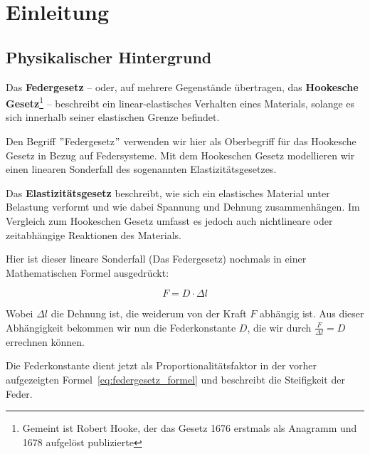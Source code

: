 \documentclass[../main.tex]{subfiles} %
\begin{document}
\section{Einleitung}\label{sec:einleitung}



    \subsection{Physikalischer Hintergrund}\label{subsec:physikalischer-hintergrund}

        Das \textbf{Federgesetz} – oder, auf mehrere Gegenstände übertragen, das \textbf{Hookesche Gesetz}\footnote{Gemeint ist Robert Hooke, der das Gesetz 1676 erstmals als Anagramm und 1678 aufgelöst publizierte} – beschreibt ein linear-elastisches Verhalten eines Materials, solange es sich innerhalb seiner elastischen Grenze befindet.

        Den Begriff \("\)Federgesetz\("\) verwenden wir hier als Oberbegriff für das Hookesche Gesetz in Bezug auf Federsysteme.
        Mit dem Hookeschen Gesetz modellieren wir einen linearen Sonderfall des sogenannten Elastizitätsgesetzes.

        \begin{tcolorbox}[title=Ausholung für das Elastizitätsgesetz]
            Das \textbf{Elastizitätsgesetz} beschreibt, wie sich ein elastisches Material unter Belastung verformt und wie dabei Spannung und Dehnung zusammenhängen.
            Im Vergleich zum Hookeschen Gesetz umfasst es jedoch auch nichtlineare oder zeitabhängige Reaktionen des Materials.
        \end{tcolorbox}

        Hier ist dieser lineare Sonderfall (Das Federgesetz) nochmals in einer Mathematischen Formel ausgedrückt:

        \begin{equation}
            F = D \cdot \Delta l
        \label{eq:federgesetz_formel}
        \end{equation}

        Wobei ${\Delta l}$ die Dehnung ist, die weiderum von der Kraft ${F}$ abhängig ist.
        Aus dieser Abhängigkeit bekommen wir nun die Federkonstante ${D}$, die wir durch ${\frac{F}{\Delta l} = D}$ errechnen können.

        Die Federkonstante dient jetzt als Proportionalitätsfaktor in der vorher aufgezeigten Formel~\ref{eq:federgesetz_formel} und beschreibt die Steifigkeit der Feder.
\end{document}
